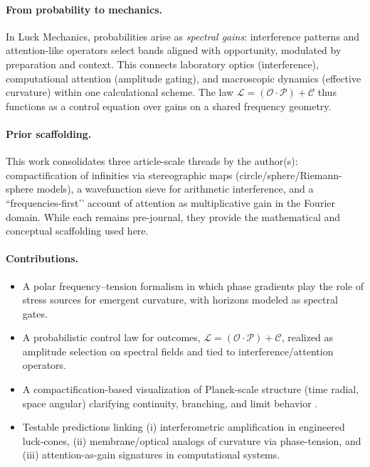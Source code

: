 \documentclass[12pt]{article}
\newcommand{\Luck}{\mathcal{L}}
\newcommand{\Opp}{\mathcal{O}}
\newcommand{\Prep}{\mathcal{P}}
\newcommand{\Circ}{\mathcal{C}}
\theoremstyle{plain}
\theoremstyle{definition}
\begin{document}
\paragraph{From probability to mechanics.}
In Luck Mechanics, probabilities arise as \emph{spectral gains}: interference patterns and attention-like operators select bands aligned with opportunity, modulated by preparation and context. This connects laboratory optics (interference), computational attention (amplitude gating), and macroscopic dynamics (effective curvature) within one calculational scheme. The law $\Luck=(\Opp\cdot\Prep)+\Circ$ thus functions as a control equation over gains on a shared frequency geometry.

\paragraph{Prior scaffolding.}
This work consolidates three article-scale threads by the author(s): compactification of infinities via stereographic maps (circle/sphere/Riemann-sphere models), a wavefunction sieve for arithmetic interference, and a “frequencies-first’’ account of attention as multiplicative gain in the Fourier domain. While each remains pre-journal, they provide the mathematical and conceptual scaffolding used here.

\paragraph{Contributions.}
\begin{itemize}[leftmargin=1.1em]
  \item A polar frequency–tension formalism in which phase gradients play the role of stress sources for emergent curvature, with horizons modeled as spectral gates.
  \item A probabilistic control law for outcomes, $\Luck=(\Opp\cdot\Prep)+\Circ$, realized as amplitude selection on spectral fields and tied to interference/attention operators.
  \item A compactification-based visualization of Planck-scale structure (time radial, space angular) clarifying continuity, branching, and limit behavior \citep{PlanckUnits,PolarCoords}.
  \item Testable predictions linking (i) interferometric amplification in engineered luck-cones, (ii) membrane/optical analogs of curvature via phase-tension, and (iii) attention-as-gain signatures in computational systems.
\end{itemize}
\end{document}
